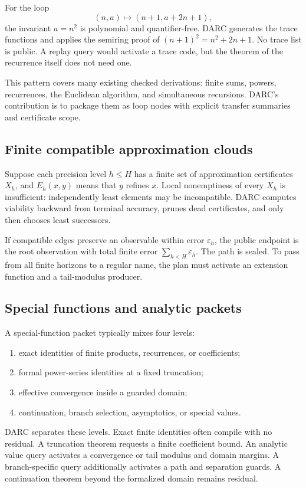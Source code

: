 For the loop
\[
  (n,a)\mapsto(n+1,a+2n+1),
\]
the invariant \(a=n^2\) is polynomial and quantifier-free.  DARC generates the
trace functions and applies the semiring proof of
\((n+1)^2=n^2+2n+1\).  No trace list is public.  A replay query would activate a
trace code, but the theorem of the recurrence itself does not need one.

This pattern covers many existing checked derivations: finite sums, powers,
recurrences, the Euclidean algorithm, and simultaneous recursions.  DARC's
contribution is to package them as loop nodes with explicit transfer summaries
and certificate scope.

\subsection{Finite compatible approximation clouds}

Suppose each precision level \(h\le H\) has a finite set of approximation
certificates \(X_h\), and \(E_h(x,y)\) means that \(y\) refines \(x\).  Local
nonemptiness of every \(X_h\) is insufficient: independently least elements
may be incompatible.  DARC computes viability backward from terminal
accuracy, prunes dead certificates, and only then chooses least successors.

If compatible edges preserve an observable within error \(\varepsilon_h\), the
public endpoint is the root observation with total finite error
\(\sum_{h<H}\varepsilon_h\).  The path is sealed.  To pass from all finite
horizons to a regular name, the plan must activate an extension function and a
tail-modulus producer.

\subsection{Special functions and analytic packets}

A special-function packet typically mixes four levels:
\begin{enumerate}
  \item exact identities of finite products, recurrences, or coefficients;
  \item formal power-series identities at a fixed truncation;
  \item effective convergence inside a guarded domain;
  \item continuation, branch selection, asymptotics, or special values.
\end{enumerate}
DARC separates these levels.  Exact finite identities often compile with no
residual.  A truncation theorem requests a finite coefficient bound.  An
analytic value query activates a convergence or tail modulus and domain
margins.  A branch-specific query additionally activates a path and separation
guards.  A continuation theorem beyond the formalized domain remains residual.

